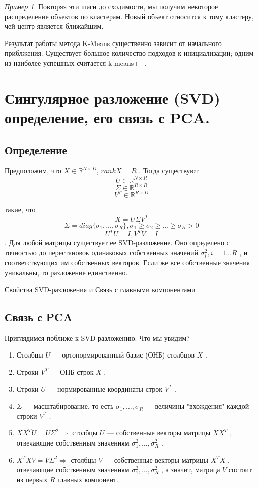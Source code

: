 \documentclass[a4paper, 12pt]{article}
\renewcommand{\geq}{\geqslant}
\theoremstyle{plain} %
\theoremstyle{definition} %
\theoremstyle{remark} %
\newtheorem{example}{Пример}
\begin{document}
\begin{example}
Повторяя эти шаги до сходимости, мы получим некоторое распределение объектов по кластерам.
Новый объект относится к тому кластеру, чей центр является ближайшим.

Результат работы метода K-Means существенно зависит от начального приблжения.
Существует большое количество подходов к инициализации;
одним из наиболее успешных считается k-means++.

\section{Сингулярное разложение (SVD) определение, его связь с PCA.}

\subsection{Определение}

Предположим, что $ X \in \mathbb{R}^{N \times D}$, $rank X = R $
.
Тогда существуют
\[
 	U \in \mathbb{R}^{N \times R}
\]
\[
	\Sigma \in \mathbb{R}^{R \times R}
\]
\[
	V^T \in \mathbb{R}^{R \times D}
\]

такие, что
\[
	X = U\Sigma V^T
\]
\[
	\Sigma = diag\{\sigma_1, ..., \sigma_R\}, \sigma_1 \geq \sigma_2 \geq ... \geq \sigma_R > 0
\]
\[
	U^TU=I, V^TV=I
\]
.
Для любой матрицы существует ее SVD-разложение. Оно определено с точностью до перестановок одинаковых собственных значений $ \sigma_i^2, i = 1 \dots R $
, и соответствующих им собственных векторов. Если же все собственные значения уникальны, то разложение единственно.

 Свойства SVD-разложения и Связь с главными компонентами

\subsection{Связь с PCA}

Приглядимся поближе к SVD-разложению. Что мы увидим?
\begin{enumerate}
	\item Столбцы $ U $
    — ортонормированный базис (ОНБ) столбцов $ X $
   .
   	\item Строки $ V^T $
    — ОНБ строк $ X $
   .
   	\item Строки $ U $
    — нормированные координаты строк $ V^T $
   .
   	\item $ \Sigma $
    — масштабирование, то есть $ \sigma_1, \dots, \sigma_R $
    — величины "вхождения" каждой строки $ V^T $
   .
   	\item $ X X^T U = U \Sigma^2 \Rightarrow $
    столбцы $ U $
    — собственные векторы матрицы $ X X^T $
   , отвечающие собственным значениям  $ \sigma_1^2, \dots, \sigma_R^2 $
   .
   	\item $ X^T X V = V \Sigma^2  \Rightarrow $
    столбцы $ V $
    — собственные векторы матрицы $ X^T X $
   , отвечающие собственным значениям  $ \sigma_1^2, \dots, \sigma_R^2 $
   , а значит, матрица $ V $
    состоит из первых $ R $
    главных компонент.
\end{enumerate}


\end{example}
\end{document}

